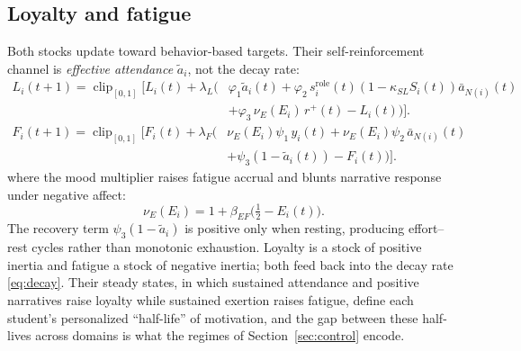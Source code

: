 \documentclass[11pt]{article}
\newcommand{\clip}{\operatorname{clip}_{[0,1]}}
\newcommand{\half}{\tfrac{1}{2}}
\begin{document}
\subsection{Loyalty and fatigue}\label{sec:loyalty}
Both stocks update toward behavior-based targets. Their self-reinforcement channel is \emph{effective attendance} $\tilde a_i$, not the decay rate:
\begin{equation}\tag{3}\label{eq:loyalty}
\begin{aligned}
L_i(t{+}1)=\clip\!\Big[L_i(t)+\lambda_L\big(&\varphi_1\tilde a_i(t)+\varphi_2\,s^{\mathrm{role}}_i(t)(1-\kappa_{SL}S_i(t))\bar a_{N(i)}(t)\\
&+\varphi_3\,\nu_E(E_i)\,r^+(t)-L_i(t)\big)\Big].
\end{aligned}
\end{equation}
\begin{equation}\tag{4}\label{eq:fatigue}
\begin{aligned}
F_i(t{+}1)=\clip\!\Big[F_i(t)+\lambda_F\big(&\nu_E(E_i)\psi_1\,y_i(t)+\nu_E(E_i)\psi_2\,\bar a_{N(i)}(t)\\
&+\psi_3(1-\tilde a_i(t))-F_i(t)\big)\Big].
\end{aligned}
\end{equation}
where the mood multiplier raises fatigue accrual and blunts narrative response under negative affect:
\begin{equation*}
\nu_E(E_i)=1+\beta_{EF}\big(\half-E_i(t)\big).
\end{equation*}
The recovery term $\psi_3(1-\tilde a_i)$ is positive only when resting, producing effort--rest cycles rather than monotonic exhaustion. Loyalty is a stock of positive inertia and fatigue a stock of negative inertia; both feed back into the decay rate \eqref{eq:decay}. Their steady states, in which sustained attendance and positive narratives raise loyalty while sustained exertion raises fatigue, define each student's personalized ``half-life'' of motivation, and the gap between these half-lives across domains is what the regimes of Section~\ref{sec:control} encode.
\end{document}
